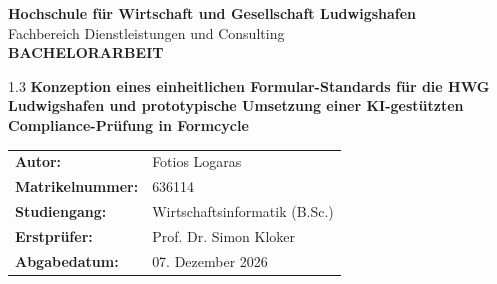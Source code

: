 \documentclass[
    12pt,
    a4paper,
    ngerman,
    oneside,
    parskip=half,
    listof=totoc,
    bibliography=totoc
]{scrreprt}
\begin{document}
\hypersetup{pageanchor=false}
\begin{titlepage}
    \centering
    {\LARGE \textbf{Hochschule für Wirtschaft und Gesellschaft Ludwigshafen}}\\[0.5cm]
    {\large Fachbereich Dienstleistungen und Consulting}\\[2.0cm]
    
    {\Large \textbf{BACHELORARBEIT}}\\[1.0cm]
    
    \begin{spacing}{1.3}
    {\huge \textbf{Konzeption eines einheitlichen Formular-Standards für die HWG Ludwigshafen und prototypische Umsetzung einer KI-gestützten Compliance-Prüfung in Formcycle}}\\[1.5cm]
    \end{spacing}
    
    \vfill
    
    \begin{tabular}{ll}
        \textbf{Autor:} & Fotios Logaras \\
        \textbf{Matrikelnummer:} & 636114 \\
        \textbf{Studiengang:} & Wirtschaftsinformatik (B.Sc.) \\
        \textbf{Erstprüfer:} & Prof. Dr. Simon Kloker \\
        \textbf{Abgabedatum:} & 07. Dezember 2026 \\
    \end{tabular}
\end{titlepage}
\hypersetup{pageanchor=true}

\tableofcontents

\listoffigures
\listoftables

\end{document}
